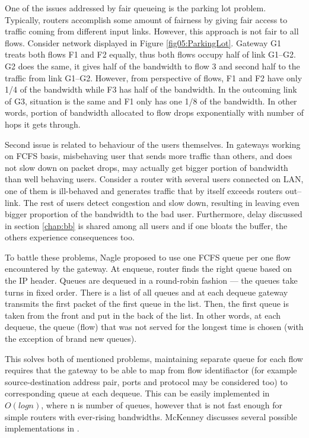 One of the issues addressed by fair queueing is the parking lot problem. Typically, routers accomplish some amount of fairness by giving fair access to traffic coming from different input links. However, this approach is not fair to all flows. Consider network displayed in Figure \ref{fig05:ParkingLot}. Gateway G1 treats both flows F1 and F2 equally, thus both flows occupy half of link G1--G2. G2 does the same, it gives half of the bandwidth to flow 3 and second half to the traffic from link G1--G2. However, from perspective of flows, F1 and F2 have only 1/4 of the bandwidth while F3 has half of the bandwidth. In the outcoming link of G3, situation is the same and F1 only has one 1/8 of the bandwidth. In other words, portion of bandwidth allocated to flow drops exponentially with number of hops it gets through.

Second issue is related to behaviour of the users themselves. In gateways working on FCFS basis, misbehaving user that sends more traffic than others, and does not slow down on packet drops, may actually get bigger portion of bandwidth than well behaving users. Consider a router with several users connected on LAN, one of them is ill-behaved and generates traffic that by itself exceeds routers out--link. The rest of users detect congestion and slow down, resulting in leaving even bigger proportion of the bandwidth to the bad user. Furthermore, delay discussed in section \ref{chap:bb} is shared among all users and if one bloats the buffer, the others experience consequences too.

To battle these problems, Nagle \cite{Nagle:FQ} proposed to use one FCFS queue per one flow encountered by the gateway. At enqueue, router finds the right queue based on the IP header. Queues are dequeued in a round-robin fashion --- the queues take turns in fixed order. There is a list of all queues and at each dequeue gateway transmits the first packet of the first queue in the list. Then, the first queue is taken from the front and put in the back of the list. In other words, at each dequeue, the queue (flow) that was not served for the longest time is chosen (with the exception of brand new queues).


This solves both of mentioned problems, maintaining separate queue for each flow requires that the gateway to be able to map from flow identifiactor (for example source-destination address pair, ports and protocol may be considered too) to corresponding queue at each dequeue. This can be easily implemented in $O(log n)$, where n is number of queues, however that is not fast enough for simple routers with ever-rising bandwidths. McKenney discusses several possible implementations in \cite[Section 2]{SFQ}.


